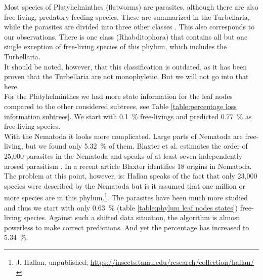       Most species of Platyhelminthes (flatworms) are parasites, although there are also free-living, 
        predatory feeding species. These are summarized in the Turbellaria, while the parasites are 
        divided into three other classes \cite{Ax1961}. This also corresponds to our observations. There 
        is one class (Rhabditophora) that contains all but one single exception of free-living species 
        of this phylum, which includes the Turbellaria. \\
      It should be noted, however, that this classification is outdated, as it has been proven that 
        the Turbellaria are not monophyletic. But we will not go into that here. \\
      For the Platyhelminthes we had more state information for the leaf nodes compared to the other 
        considered subtrees, see Table \ref{table:percentage loss information subtrees}. We start with 
        0.1~\% free-livings and predicted 0.77~\% as free-living species. \\

      With the Nematoda it looks more complicated. Large parts of Nematoda are free-living, but we 
        found only 5.32~\% of them. Blaxter et al. estimates the order of 25,000 parasites in the 
        Nematoda \cite{Blaxter2015} and speaks of at least seven independently arosed parasitism 
        \cite{Blaxter1998}. In a recent article Blaxter identifies 18 origins \cite{Blaxter2015} in 
        Nematoda. \\
      The problem at this point, however, is: Hallan speaks of the fact that only 23,000 species 
        were described by the Nematoda but is it assumed that one million or more species are in this 
        phylum.\footnote{J. Hallan, unpublished; 
          \hyperlink{https://insects.tamu.edu/research/collection/hallan/}
          {https://insects.tamu.edu/research/collection/hallan/}
        }.  The parasites have been much more studied and thus we start 
        with only 0.63~\% (table \ref{table:phylum leaf nodes states}) free-living species. Against such 
        a shifted data situation, the algorithm is almost powerless to make correct predictions. And yet 
        the percentage has increased to 5.34~\%. \\


